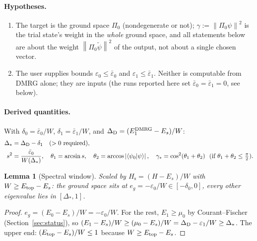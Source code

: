 \documentclass[11pt]{article}
\newtheorem{lemma}{Lemma}
\theoremstyle{definition}
\newcommand{\norm}[1]{\left\lVert #1\right\rVert}
\newcommand{\abs}[1]{\left\lvert #1\right\rvert}
\newcommand{\braket}[2]{\left\langle #1 \middle| #2\right\rangle}
\newcommand{\Hs}{H_{\mathrm s}}
\begin{document}
\paragraph{Hypotheses.}
\begin{enumerate}[label=(H\arabic*),leftmargin=*]
\item The target is the ground space $\Pi_0$ (nondegenerate or not); $\gamma:=\norm{\Pi_0\psi}^2$ is the trial state's weight in the \emph{whole}
      ground space, and all statements below are about the weight $\norm{\Pi_0\tilde\psi}^2$ of the output, not about a single chosen vector.
\item The user supplies bounds $\varepsilon_0\le\bar\varepsilon_0$ and $\varepsilon_1\le\bar\varepsilon_1$. Neither is computable from DMRG
      alone; they are inputs (the runs reported here set $\bar\varepsilon_0=\bar\varepsilon_1=0$, see below).
\end{enumerate}

\paragraph{Derived quantities.} With $\delta_0=\bar\varepsilon_0/W$, $\delta_1=\bar\varepsilon_1/W$, and $\Delta_{\rm D}=(E_1^{\rm DMRG}-E_s)/W$:
\begin{align}
  \Delta_*&=\Delta_{\rm D}-\delta_1 \quad(>0\text{ required}),\\
  s^2&=\frac{\bar\varepsilon_0}{W(\Delta_*)},\quad \theta_1=\arcsin s,\quad \theta_2=\arccos\abs{\braket{\psi_0}{\psi}},\quad
  \gamma_*=\cos^2(\theta_1+\theta_2)\ \ (\text{if }\theta_1+\theta_2\le\tfrac\pi2).
\end{align}

\begin{lemma}[Spectral window]\label{lem:window}
Scaled by $\Hs=(H-E_s)/W$ with $W\ge E_{\rm top}-E_s$: the ground space sits at $e_g=-\varepsilon_0/W\in[-\delta_0,0]$, every other eigenvalue
lies in $[\Delta_*,1]$.
\end{lemma}
\begin{proof}
$e_g=(E_0-E_s)/W=-\varepsilon_0/W$. For the rest, $E_1\ge\mu_0$ by Courant--Fischer (Section~\ref{sec:status}), so $(E_1-E_s)/W\ge(\mu_0-E_s)/W
=\Delta_{\rm D}-\varepsilon_1/W\ge\Delta_*$. The upper end: $(E_{\rm top}-E_s)/W\le1$ because $W\ge E_{\rm top}-E_s$.
\end{proof}
\end{document}
